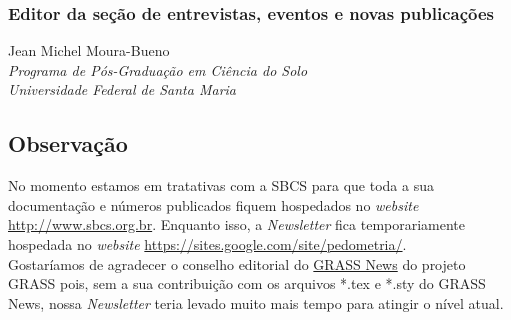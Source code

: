 \subsubsection{Editor da seção de entrevistas, eventos e novas publicações}
Jean Michel Moura-Bueno\\
\textit{Programa de Pós-Graduação em Ciência do Solo}\\
\textit{Universidade Federal de Santa Maria}\\
\subsection{Observação}
No momento estamos em tratativas com a SBCS para que toda a sua documentação e números publicados fiquem hospedados no \textit{website} \url{http://www.sbcs.org.br}. Enquanto isso, a \textit{Newsletter} fica temporariamente hospedada no \textit{website} \url{https://sites.google.com/site/pedometria/}.\\
Gostaríamos de agradecer o conselho editorial do \href{http://grass.osgeo.org/newsletter/}{GRASS News} do projeto GRASS pois, sem a sua contribuição com os arquivos *.tex e *.sty do GRASS News, nossa \textit{Newsletter} teria levado muito mais tempo para atingir o nível atual.
